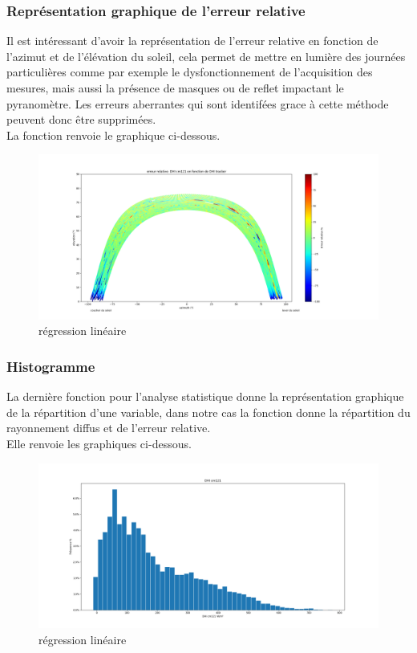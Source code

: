\documentclass[12pt,a4paper]{article}
\begin{document}
\begin{flushleft}
\subsubsection{Représentation graphique de l'erreur relative}

Il est intéressant d'avoir la représentation de l'erreur relative en fonction de l'azimut et de l'élévation du soleil, cela permet de mettre en lumière des journées particulières comme par exemple le dysfonctionnement de l'acquisition des mesures, mais aussi la présence de masques ou de reflet impactant le pyranomètre. Les erreurs aberrantes qui sont identifées grace à cette méthode peuvent donc être supprimées.\\
La fonction renvoie le graphique ci-dessous.
 
\begin{figure}[H]
\centering
\includegraphics[width=15cm]{image/erreur_relative/1.png} 
\caption{régression linéaire}  
\end{figure}

\subsubsection{Histogramme}

La dernière fonction pour l'analyse statistique donne la représentation graphique de la répartition d'une variable, dans notre cas la fonction donne la répartition du rayonnement diffus et de l'erreur relative.\\
Elle renvoie les graphiques ci-dessous.
\begin{figure}[H]
\centering
\includegraphics[width=15cm]{image/histogramme/1.png} 
\caption{régression linéaire}  
\end{figure}


\end{flushleft}
\end{document}
